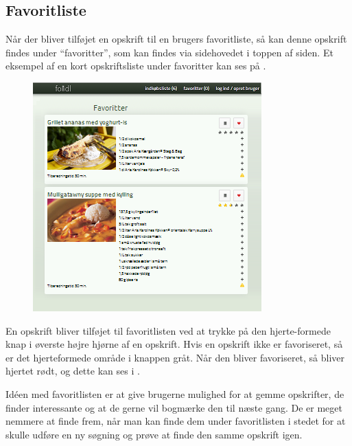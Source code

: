 \subsection{Favoritliste}
\label{subsec:brug-favoritliste}

Når der bliver tilføjet en opskrift til en brugers favoritliste, så kan denne opskrift findes under ``favoritter'', som kan findes via sidehovedet i toppen af siden. Et eksempel af en kort opskriftsliste under favoritter kan ses på .

\begin{figure}[H]
	\centering
	\includegraphics[scale=1]{billeder/foodl/thumbnails/favoritter.png}
	\label{fig:overblik-favoritter}
\end{figure}

En opskrift bliver tilføjet til favoritlisten ved at trykke på den hjerte-formede knap i øverste højre hjørne af en opskrift. Hvis en opskrift ikke er favoriseret, så er det hjerteformede område i knappen gråt. Når den bliver favoriseret, så bliver hjertet rødt, og dette kan ses i .

Idéen med favoritlisten er at give brugerne mulighed for at gemme opskrifter, de finder interessante og at de gerne vil bogmærke den til næste gang. De er meget nemmere at finde frem, når man kan finde dem under favoritlisten i stedet for at skulle udføre en ny søgning og prøve at finde den samme opskrift igen.
